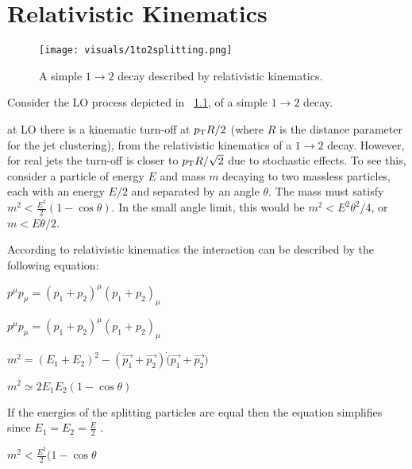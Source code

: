 

\chapter{Relativistic Kinematics}\label{chap:RelativisticKinematics}


\begin{figure}[htb]

\centering
\texttt{[image: visuals/1to2splitting.png]}
\caption{ A simple $ 1 \rightarrow 2  $ decay described by relativistic kinematics.}
\label{onetotwo}
\end{figure}

Consider the LO process depicted in ~\ref{onetotwo}, of a simple $ 1 \rightarrow 2  $ decay.


at LO there is a kinematic turn-off at $p_{\mathrm{T}} R/2$ (where $R$ is the
distance parameter for the jet clustering), from the relativistic kinematics of a $1\rightarrow 2$ decay. 
However, for real jets the turn-off is closer to $p_{\mathrm{T}} R/\sqrt{2}$ due to stochastic effects. 
To see this, consider a particle of energy $E$ and mass $m$ decaying to two massless
particles, each with an energy $E/2$ and separated by an angle $\theta$. 
The mass must satisfy $m^2 < \frac{E^2}{2}\left( 1 - \cos{\theta}\right)$. In the small
angle limit, this would be $m^2 < E^2\theta^2/4$, or $m < E\theta/2$.





According to relativistic kinematics the interaction can be described by the following equation:\newline

$p^{\mu} p_{\mu}  =  (p_1 + p_2)^{\mu} (p_1 + p_2)_{\mu}  $\newline

$p^{\mu} p_{\mu}  =  (p_1 + p_2)^{\mu} (p_1 + p_2)_{\mu}  $\newline

$m^2  = (E_1 + E_2)^2  - (\vec{p_1} + \vec{p_2} ) \dot (\vec{p_1} + \vec{p_2} )  $\newline


$m^2  \simeq 2 E_1 E_2 (1 - \cos \theta ) $\newline

If the energies of the splitting particles are equal then the equation simplifies since  $ E_1 = E_2 = \frac{E}{2} $ .


$m^2  < \frac{E^2}{2} ( 1 - \cos{\theta}  $\newline

